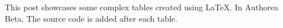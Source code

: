 This post showcases some complex tables created using LaTeX. In Authorea Beta,  The source code is added after each table.

\newline